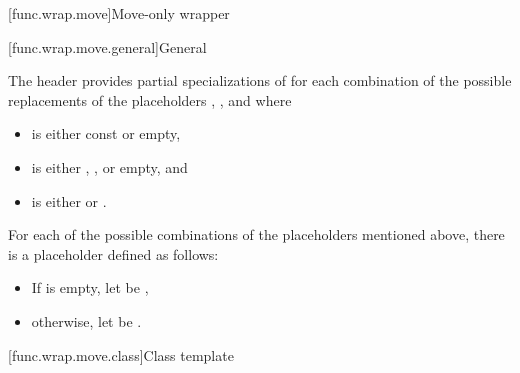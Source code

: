 [func.wrap.move]{Move-only wrapper}

[func.wrap.move.general]{General}

\pnum
The header provides partial specializations of  for each combination of the possible replacements of the placeholders \cv{}, , and  where
\begin{itemize}
\item \cv{} is either const or empty,
\item {} is either \tcode{\&}, \tcode{\&\&}, or empty, and
\item {} is either  or .
\end{itemize}

\pnum
For each of the possible combinations of the placeholders mentioned above, there is a placeholder  defined as follows:
\begin{itemize}
\item If  is empty, let  be \cv{}\tcode{\&},
\item otherwise, let  be \cv{} .
\end{itemize}

[func.wrap.move.class]{Class template }

